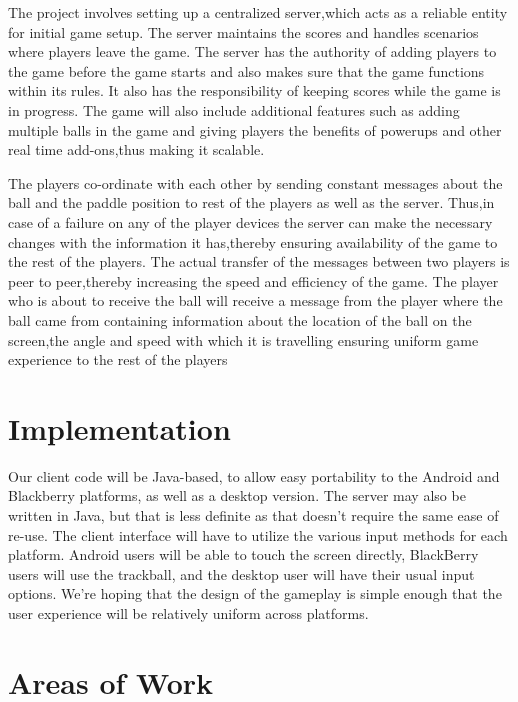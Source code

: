 \documentclass{sig-alternate}
\begin{document}

The project involves setting up a centralized server,which acts as a
reliable entity for initial game setup.  The server maintains the scores
and handles scenarios where players leave the game.  The server has the
authority of adding players to the game before the game starts and also
makes sure that the game functions within its rules.  It also has the
responsibility of keeping scores while the game is in progress.  The game
will also include additional features such as adding multiple balls in the
game and giving players the benefits of powerups and other real time
add-ons,thus making it scalable.  

The players co-ordinate with each other by sending constant messages about
the ball and the paddle position to rest of the players as well as the
server.  Thus,in case of a failure on any of the player devices the server
can make the necessary changes with the information it has,thereby ensuring
availability of the game to the rest of the players.  The actual transfer
of the messages between two players is peer to peer,thereby increasing the
speed and efficiency of the game.  The player who is about to receive the
ball will receive a message from the player where the ball came from
containing information about the location of the ball on the screen,the
angle and speed with which it is travelling ensuring uniform game
experience to the rest of the players


\section{Implementation}
\label{implementation}


Our client code will be Java-based, to allow easy portability to the
Android and Blackberry platforms, as well as a desktop version.  The server
may also be written in Java, but that is less definite as that doesn't
require the same ease of re-use.  The client interface will have to utilize
the various input methods for each platform.  Android users will be able to
touch the screen directly, BlackBerry users will use the trackball, and the
desktop user will have their usual input options.  We're hoping that the
design of the gameplay is simple enough that the user experience will be
relatively uniform across platforms.


\section{Areas of Work}
\label{areas of work}
\end{document}
